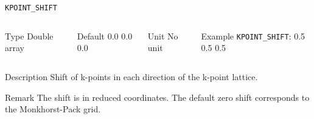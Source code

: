 \documentclass[xcolor=dvipsnames,t]{beamer}
\begin{document}
\begin{frame}[allowframebreaks]{\texttt{KPOINT\_SHIFT}} \label{KPOINT_SHIFT}
\vspace*{-12pt}
\begin{columns}
\begin{block}{Type}
Double array
\end{block}

\begin{block}{Default}
 0.0 0.0 0.0
\end{block}

\begin{block}{Unit}
No unit
\end{block}

\begin{block}{Example}
\texttt{KPOINT\_SHIFT}: 0.5 0.5 0.5
\end{block}
\end{columns}

\begin{block}{Description}
Shift of k-points in each direction of the k-point lattice.
\end{block}

\begin{block}{Remark}
The shift is in reduced coordinates. The default zero shift corresponds to the Monkhorst-Pack grid.
\end{block}

\end{frame}
\end{document}

